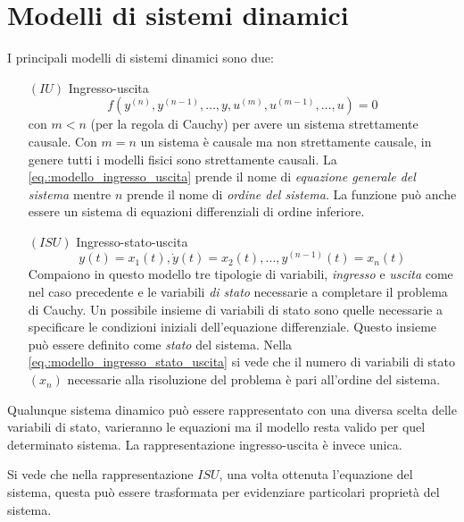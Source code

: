\chapter{Modelli di sistemi dinamici}
I principali modelli di sistemi dinamici sono due:
\begin{itemize}
\item [$(IU)$]Ingresso-uscita
\begin{equation}
f\left(y^{(n)},y^{(n-1)},\dots,y,u^{(m)},u^{(m-1)},\dots,u\right)=0
\label{eq.:modello_ingresso_uscita}
\end{equation}
con $m<n$ (per la regola di Cauchy) per avere un sistema strettamente causale. Con $m=n$ un sistema
è causale ma non strettamente causale, in genere tutti i modelli fisici sono strettamente causali.
La \ref{eq.:modello_ingresso_uscita} prende il nome di \textit{equazione generale del sistema}
mentre $n$
prende il nome di \textit{ordine del sistema}.
La funzione può anche essere un sistema di equazioni differenziali di ordine inferiore.
\item[$(ISU)$] Ingresso-stato-uscita
\begin{equation}
y(t) = x_1(t), \dot{y}(t) = x_2(t),\dots,y^{(n-1)}(t)=x_n(t)
\label{eq.:modello_ingresso_stato_uscita}
\end{equation}
Compaiono in questo modello tre tipologie di variabili, \textit{ingresso} e \textit{uscita} come nel
caso precedente e le variabili \textit{di stato} necessarie a completare il problema di Cauchy.
Un possibile insieme di variabili di stato sono quelle necessarie a specificare le condizioni
iniziali dell'equazione differenziale. Questo insieme può essere definito come \textit{stato} del
sistema.
Nella \ref{eq.:modello_ingresso_stato_uscita} si vede che il numero di variabili di stato $(x_n)$
necessarie alla risoluzione del problema è pari all'ordine del sistema.
\end{itemize}

Qualunque sistema dinamico può essere rappresentato con una diversa scelta delle variabili di
stato, varieranno le equazioni ma il modello resta valido per quel determinato sistema. La
rappresentazione ingresso-uscita è invece unica.

Si vede che nella rappresentazione $ISU$, una volta ottenuta l'equazione del sistema, questa può
essere trasformata per evidenziare particolari proprietà del sistema.

\newpage

